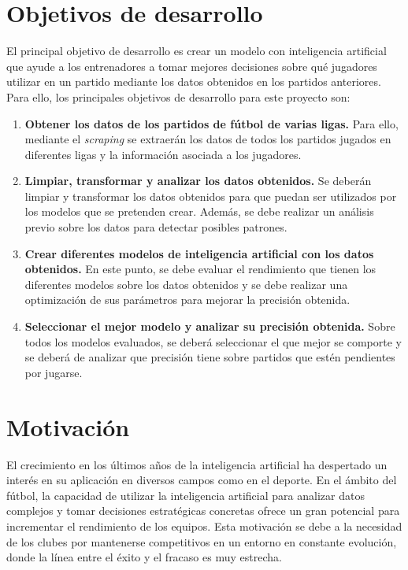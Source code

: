 \section{Objetivos de desarrollo}
\label{sec:desarrollo}
El principal objetivo de desarrollo es crear un modelo con inteligencia artificial que ayude a los entrenadores a tomar mejores decisiones sobre qué jugadores utilizar en un partido mediante los datos obtenidos en los partidos anteriores. Para ello, los principales objetivos de desarrollo para este proyecto son:
 \begin{enumerate}

    \item \textbf{Obtener los datos de los partidos de fútbol de varias ligas.}
    Para ello, mediante el \textit{scraping} se extraerán los datos de todos los partidos jugados en diferentes ligas y la información asociada a los jugadores.
    
    \item \textbf{Limpiar, transformar y analizar los datos obtenidos.}
    Se deberán limpiar y transformar los datos obtenidos para que puedan ser utilizados por los modelos que se pretenden crear. Además, se debe realizar un análisis previo sobre los datos para detectar posibles patrones.
    
    \item \textbf{Crear diferentes modelos de inteligencia artificial con los datos obtenidos.}
    En este punto, se debe evaluar el rendimiento que tienen los diferentes modelos sobre los datos obtenidos y se debe realizar una optimización de sus parámetros para mejorar la precisión obtenida.

    \item \textbf{Seleccionar el mejor modelo y analizar su precisión obtenida.}
    Sobre todos los modelos evaluados, se deberá seleccionar el que mejor se comporte y se deberá de analizar que precisión tiene sobre partidos que estén pendientes por jugarse.





 \end{enumerate}




\section{Motivación}


El crecimiento en los últimos años de la inteligencia artificial ha despertado un interés en su aplicación en diversos campos como en el deporte. En el ámbito del fútbol, la capacidad de utilizar la inteligencia artificial para analizar datos complejos y tomar decisiones estratégicas concretas ofrece un gran potencial para incrementar el rendimiento de los equipos. Esta motivación se debe a la necesidad de los clubes por mantenerse competitivos en un entorno en constante evolución, donde la línea entre el éxito y el fracaso es muy estrecha.

